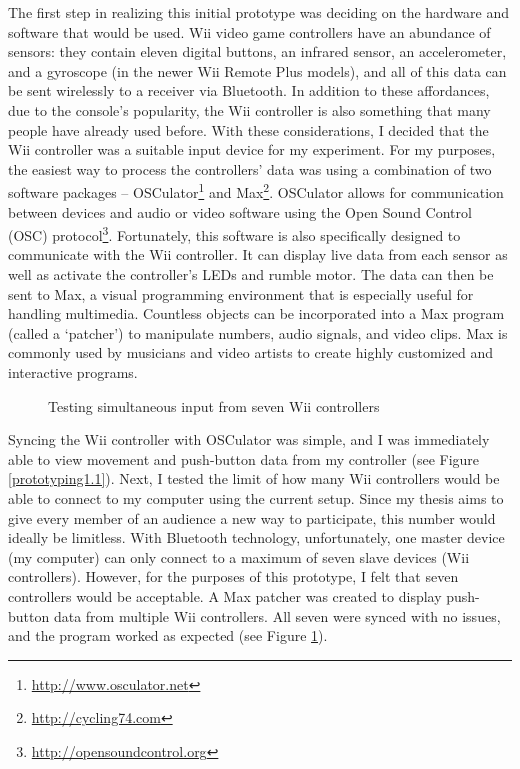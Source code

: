 The first step in realizing this initial prototype was deciding on the hardware and software that would be used. Wii video game controllers have an abundance of sensors: they contain eleven digital buttons, an infrared sensor, an accelerometer, and a gyroscope (in the newer Wii Remote Plus models), and all of this data can be sent wirelessly to a receiver via Bluetooth. In addition to these affordances, due to the console's popularity, the Wii controller is also something that many people have already used before. With these considerations, I decided that the Wii controller was a suitable input device for my experiment. For my purposes, the easiest way to process the controllers' data was using a combination of two software packages -- OSCulator\footnote{\url{http://www.osculator.net}} and Max\footnote{\url{http://cycling74.com}}. OSCulator allows for communication between devices and audio or video software using the Open Sound Control (OSC) protocol\footnote{\url{http://opensoundcontrol.org}}. Fortunately, this software is also specifically designed to communicate with the Wii controller. It can display live data from each sensor as well as activate the controller's LEDs and rumble motor. The data can then be sent to Max, a visual programming environment that is especially useful for handling multimedia. Countless objects can be incorporated into a Max program (called a `patcher') to manipulate numbers, audio signals, and video clips. Max is commonly used by musicians and video artists to create highly customized and interactive programs.

\begin{figure}
	\centering

	\hspace{0.1cm}
	\caption{Testing simultaneous input from seven Wii controllers}

	\label{prototyping1.2}
\end{figure}

Syncing the Wii controller with OSCulator was simple, and I was immediately able to view movement and push-button data from my controller (see Figure \ref{prototyping1.1}). Next, I tested the limit of how many Wii controllers would be able to connect to my computer using the current setup. Since my thesis aims to give every member of an audience a new way to participate, this number would ideally be limitless. With Bluetooth technology, unfortunately, one master device (my computer) can only connect to a maximum of seven slave devices (Wii controllers). However, for the purposes of this prototype, I felt that seven controllers would be acceptable. A Max patcher was created to display push-button data from multiple Wii controllers. All seven were synced with no issues, and the program worked as expected (see Figure \ref{prototyping1.2}).


